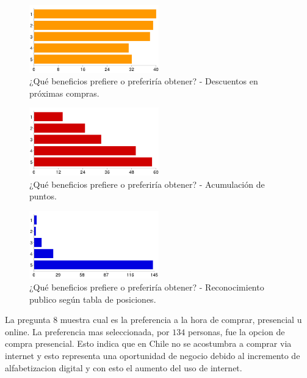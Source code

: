 \begin{figure}[!htb]
  \centering
  \includegraphics[width=0.5\textwidth]{images/chartPreg7_2.png}
  \caption[chart7-2]{¿Qué beneficios prefiere o preferiría obtener? - Descuentos en próximas compras.}
  \label{fig:chart2}
\end{figure}

\begin{figure}[!htb]
  \centering
  \includegraphics[width=0.5\textwidth]{images/chartPreg7_3.png}
  \caption[chart7-3]{¿Qué beneficios prefiere o preferiría obtener? - Acumulación de puntos.}
  \label{fig:chart2}
\end{figure}

\begin{figure}[!htb]
  \centering
  \includegraphics[width=0.5\textwidth]{images/chartPreg7_1.png}
  \caption[chart7-4]{¿Qué beneficios prefiere o preferiría obtener? - Reconocimiento publico según tabla de posiciones.}
  \label{fig:chart2}
\end{figure}

La pregunta $8$ muestra cual es la preferencia a la hora de comprar, presencial u online. La preferencia 
mas seleccionada, por $134$ personas, fue la opcion de compra presencial. Esto indica que en Chile 
no se acostumbra a comprar via internet y esto representa una oportunidad de negocio debido al 
incremento de alfabetizacion digital y con esto el aumento del uso de internet.

